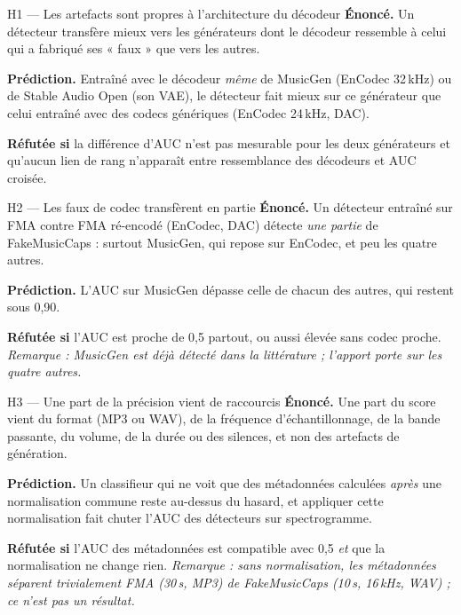 \documentclass[11pt,a4paper]{article}
\begin{document}
\begin{hyp}{H1 --- Les artefacts sont propres à l'architecture du décodeur}
\textbf{Énoncé.} Un détecteur transfère mieux vers les générateurs dont le décodeur ressemble à celui qui a fabriqué ses « faux » que vers les autres.

\textbf{Prédiction.} Entraîné avec le décodeur \emph{même} de MusicGen (EnCodec 32\,kHz) ou de Stable Audio Open (son VAE), le détecteur fait mieux sur ce générateur que celui entraîné avec des codecs génériques (EnCodec 24\,kHz, DAC).

\textbf{Réfutée si} la différence d'AUC n'est pas mesurable pour les deux générateurs et qu'aucun lien de rang n'apparaît entre ressemblance des décodeurs et AUC croisée.
\end{hyp}

\begin{hyp}{H2 --- Les faux de codec transfèrent en partie}
\textbf{Énoncé.} Un détecteur entraîné sur FMA contre FMA ré-encodé (EnCodec, DAC) détecte \emph{une partie} de FakeMusicCaps : surtout MusicGen, qui repose sur EnCodec, et peu les quatre autres.

\textbf{Prédiction.} L'AUC sur MusicGen dépasse celle de chacun des autres, qui restent sous 0,90.

\textbf{Réfutée si} l'AUC est proche de 0,5 partout, ou aussi élevée sans codec proche. \emph{Remarque : MusicGen est déjà détecté dans la littérature ; l'apport porte sur les quatre autres.}
\end{hyp}

\begin{hyp}{H3 --- Une part de la précision vient de raccourcis}
\textbf{Énoncé.} Une part du score vient du format (MP3 ou WAV), de la fréquence d'échantillonnage, de la bande passante, du volume, de la durée ou des silences, et non des artefacts de génération.

\textbf{Prédiction.} Un classifieur qui ne voit que des métadonnées calculées \emph{après} une normalisation commune reste au-dessus du hasard, et appliquer cette normalisation fait chuter l'AUC des détecteurs sur spectrogramme.

\textbf{Réfutée si} l'AUC des métadonnées est compatible avec 0,5 \emph{et} que la normalisation ne change rien. \emph{Remarque : sans normalisation, les métadonnées séparent trivialement FMA (30\,s, MP3) de FakeMusicCaps (10\,s, 16\,kHz, WAV) ; ce n'est pas un résultat.}
\end{hyp}
\end{document}
